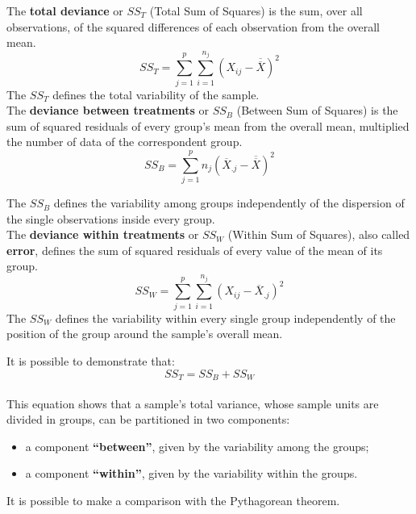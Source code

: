 
\begin{frame}
  \vspace*{.25cm}
  The \textbf{total deviance} or {\boldmath $ SS_T $} (Total Sum of Squares) is the sum, over all observations, of the squared differences of each observation from the overall mean.
  $$ SS_T=\sum_{j=1}^p \sum_{i=1}^{n_j}{(X_{ij}-\overline{\overline{X}})^2} $$
  The {\boldmath$ SS_T $} defines the total variability of the sample.\\
  \vspace*{.5cm}
  The \textbf{deviance between treatments} or {\boldmath $ SS_B $} (Between Sum of Squares) is the sum of squared residuals of every group's mean from the overall mean, multiplied the number of data of the correspondent group.
  $$ SS_B=\sum_{j=1}^p{n_{j}(\overline{X}_{.j}-\overline{\overline{X}})^2} $$
\end{frame}

\begin{frame}
  \vspace*{.25cm}
  The {\boldmath  $ SS_B $} defines the variability among groups independently of the dispersion of the single observations inside every group.\\
  \vspace*{.5cm}
  The \textbf{deviance within treatments} or {\boldmath $ SS_W $} (Within Sum of Squares), also called \textbf{error}, defines the sum of squared residuals of every value of the mean of its group.
  $$ SS_W = \sum_{j=1}^p \sum_{i=1}^{n_j}{(X_{ij}-\overline{X}_{.j})^2} $$
  The {\boldmath $ SS_W $} defines the variability within every single group independently of the position of the group around the sample's overall mean. 
\end{frame}

\begin{frame}
  \vspace*{.25cm}
  It is possible to demonstrate that:
  $$ SS_T = SS_B + SS_W $$ \\
  \vspace*{.25cm}
  This equation shows that a sample's total variance, whose sample units are divided in groups, can be partitioned in two components:
  \begin{itemize}
    \item a component \textbf{``between''}, given by the variability among the groups;
    \item a component \textbf{``within''}, given by the variability within the groups. 
  \end{itemize}
  \vspace*{.25cm}
  It is possible to make a comparison with the Pythagorean theorem.
\end{frame}

